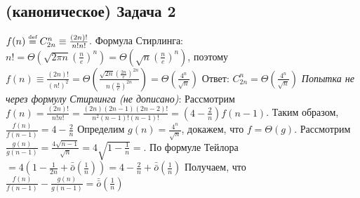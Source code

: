 \documentclass[a4paper]{article}
\def\eqdef{\overset{\mbox{\tiny def}}{=}}
\newcommand{\smallo}{\bar{\bar{o}}}
\begin{document}
\subsection*{(каноническое) Задача 2}
$f(n)\eqdef C^{n}_{2n}\equiv\frac{(2n)!}{n!n!}$.
Формула Стирлинга: $n!=\Theta(\sqrt{2\pi n}(\frac{n}{e})^n)=\Theta(\sqrt{n}(\frac{n}{e})^n)$, поэтому $f(n)\equiv\frac{(2n)!}{(n!)^2}=\Theta(\frac{\sqrt{2n}(\frac{2n}{e})^{2n}}{n(\frac{n}{e})^{2n}})=\Theta(\frac{4^n}{\sqrt{n}})$\newline
Ответ: $\boxed{C^{n}_{2n}=\Theta(\frac{4^n}{\sqrt{n}})}$\newline
{\em Попытка не через формулу Стирлинга (не дописано)}:
Рассмотрим $f(n)=\frac{(2n)!}{n!n!}=\frac{(2n)(2n-1)(2n-2)!}{n^2(n-1)!(n-1)!}=(4-\frac{2}{n})f(n-1)$. Таким образом, $\frac{f(n)}{f(n-1)}=4-\frac{2}{n}$
Определим $g(n)=\frac{4^n}{\sqrt{n}}$, докажем, что $f=\Theta(g)$. Рассмотрим $\frac{g(n)}{g(n-1)}=\frac{4\sqrt{n-1}}{\sqrt{n}}=4\sqrt{1-\frac{1}{n}}\boxed{=}$. По формуле Тейлора $\boxed{=}4(1-\frac{1}{2n}+\smallo(\frac{1}{n}))=4-\frac{2}{n}+\smallo(\frac{1}{n})$\newline
Получаем, что $\frac{f(n)}{f(n-1)}-\frac{g(n)}{g(n-1)}=\smallo(\frac{1}{n})$
\end{document}

